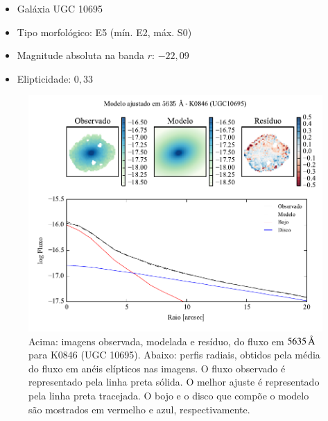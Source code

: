 \begin{itemize}
  \item Galáxia UGC 10695
  \item Tipo morfológico: E5 (mín. E2, máx. S0)
  \item Magnitude absoluta na banda $r$: $-22,09$
  \item Elipticidade: $0,33$
\end{itemize}

\begin{figure}
	\includegraphics[page=1]{figuras-decomp/K0846_sample006a}
	\caption[Ajuste morfológico em $5635\,\angstrom$ de K0846 (UGC 10695)]
	{Acima: imagens observada, modelada e resíduo, do fluxo em $5635\,\angstrom$
	para K0846 (UGC 10695). Abaixo: perfis radiais, obtidos pela média do fluxo em
	anéis elípticos nas imagens. O fluxo observado é representado pela linha preta
	sólida. O melhor ajuste é representado pela linha preta tracejada. O bojo e o
	disco que compõe o modelo são mostrados em vermelho e azul, respectivamente.}
	\label{fig:decompRadprof:K0846}
\end{figure}

